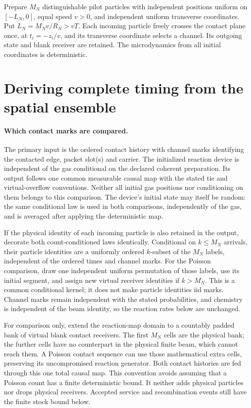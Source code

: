 \documentclass[11pt]{article}
\theoremstyle{definition}\newtheorem{definition}[theorem]{Definition}
\theoremstyle{remark}\newtheorem{remark}[theorem]{Remark}
\begin{document}
Prepare $M_N$ distinguishable pilot particles with independent positions uniform on $[-L_N,0]$, equal speed $v>0$, and independent uniform transverse coordinates. Put $L_N=M_Nv/R_N>vT$. Each incoming particle freely crosses the contact plane once, at $t_i=-z_i/v$, and its transverse coordinate selects a channel. Its outgoing state and blank receiver are retained. The microdynamics from all initial coordinates is deterministic.

\section{Deriving complete timing from the spatial ensemble}
\paragraph{Which contact marks are compared.}
The primary input is the ordered contact history with channel marks
identifying the contacted edge, packet slot(s) and carrier.  The initialized
reaction device is independent of the gas conditional on the declared
coherent preparation.  Its output follows one common measurable causal
map with the stated tie and virtual-overflow conventions.  Neither all
initial gas positions nor conditioning on them belongs to this comparison.
The device's initial state may itself be random: the same conditional
law is used in both comparisons, independently of the gas, and is
averaged after applying the deterministic map.

If the physical identity of each incoming particle is also retained in
the output, decorate both count-conditioned laws identically.  Conditional
on $k\le M_N$ arrivals, their particle identities are a uniformly ordered
$k$-subset of the $M_N$ labels, independent of the ordered times and
channel marks.  For the Poisson comparison, draw one independent uniform
permutation of those labels, use its initial segment, and assign new
virtual receiver identities if $k>M_N$.  This is a common conditional
kernel; it does not make particle identities iid marks.  Channel marks
remain independent with the stated probabilities, and chemistry is
independent of the beam identity, so the reaction rates below are unchanged.

For comparison only, extend the reaction-map domain to a countably padded bank of virtual blank contact receivers. The first $M_N$ cells are the physical bank; the further cells have no counterpart in the physical finite beam, which cannot reach them. A Poisson contact sequence can use those mathematical extra cells, preserving its uncompromised reaction generator. Both contact histories are fed through this one total causal map. This convention avoids assuming that a Poisson count has a finite deterministic bound. It neither adds physical particles nor drops physical receivers. Accepted service and recombination events still have the finite stock bound below.
\end{document}
